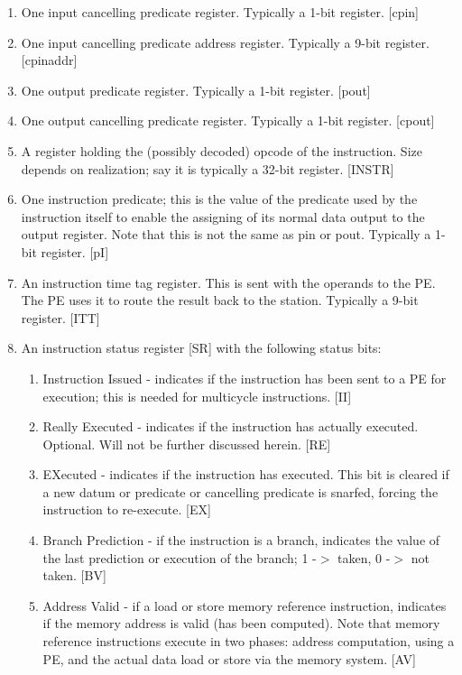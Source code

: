 \documentclass[10pt,dvips]{article}
\begin{document}
\begin{enumerate}
\item One input cancelling predicate register. Typically a 1-bit register. [cpin]
\item One input cancelling predicate address register. Typically a 9-bit register.
[cpinaddr]
\item One output predicate register. Typically a 1-bit register. [pout]
\item One output cancelling predicate register. Typically a 1-bit register. [cpout]
\item A register holding the (possibly decoded) opcode of the instruction.
Size depends on realization; say it is typically a 32-bit register. [INSTR]
\item One instruction predicate; this is the value of the
predicate used by the instruction itself to enable the assigning of its normal
data output
to the output register. Note that this is not the same as pin or pout. Typically
a 1-bit register. [pI]
\item An instruction time tag register. This is sent with the operands to the
PE. The PE uses it to route the result back to the station. Typically a 9-bit
register. [ITT]
\item An instruction status register [SR] with the following status bits:
\begin{enumerate}
\item Instruction
Issued - indicates if the instruction has been sent to a PE for execution; this
is needed for multicycle instructions. [II]
\item Really Executed - indicates if the instruction has actually executed.
Optional. Will not be further discussed herein. [RE]
\item EXecuted - indicates if the instruction has executed. This bit is cleared if
a new datum or predicate or cancelling predicate is snarfed, forcing the instruction
to re-execute. [EX]
\item Branch Prediction - if the instruction is a branch, indicates the value of the
last prediction or execution of the branch; 1 -$>$ taken, 0 -$>$ not taken. [BV]
\item Address Valid - if a load or store memory reference instruction, indicates if the
memory address is valid (has been computed). Note that memory reference instructions
execute in two phases: address computation, using a PE, and the actual data load or
store via the memory system. [AV]

\end{enumerate}

\end{enumerate}
\end{document}
